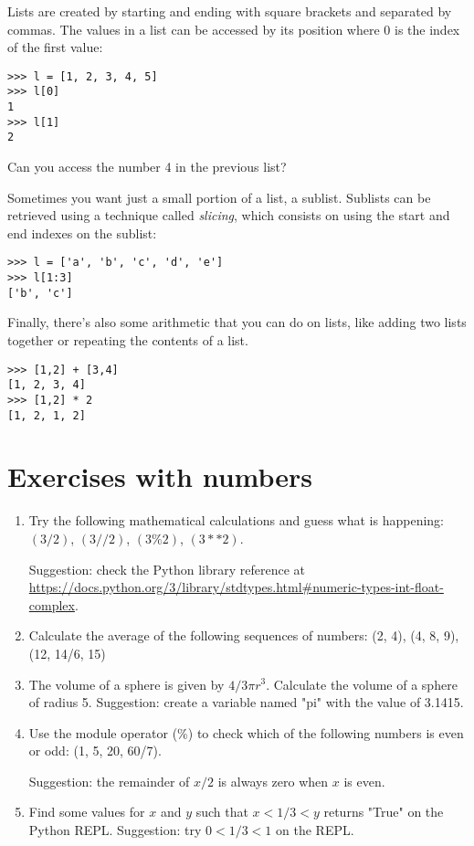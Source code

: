 Lists are created by starting and ending with square brackets and separated by commas. The values in a list can be accessed by its position where 0 is the index of the first value:

\begin{lstlisting}
>>> l = [1, 2, 3, 4, 5]
>>> l[0]
1
>>> l[1]
2
\end{lstlisting}

Can you access the number 4 in the previous list?

Sometimes you want just a small portion of a list, a sublist. Sublists can be retrieved using a technique called \textit{slicing}, which consists on using the start and end indexes on the sublist:

\begin{lstlisting}
>>> l = ['a', 'b', 'c', 'd', 'e']
>>> l[1:3]
['b', 'c']
\end{lstlisting}

Finally, there's also some arithmetic that you can do on lists, like adding two lists together or repeating the contents of a list.

\begin{lstlisting}
>>> [1,2] + [3,4]
[1, 2, 3, 4]
>>> [1,2] * 2
[1, 2, 1, 2]
\end{lstlisting}


\section{Exercises with numbers}

\begin{enumerate}

\item Try the following mathematical calculations and guess what is happening: $(3 / 2)$, $(3 // 2)$, $(3 \% 2)$, $(3**2)$.

Suggestion: check the Python library reference at \url{https://docs.python.org/3/library/stdtypes.html#numeric-types-int-float-complex}.

\item Calculate the average of the following sequences of numbers: (2, 4), (4, 8, 9), (12, 14/6, 15)

\item The volume of a sphere is given by $4/3\pi r^3$. Calculate the volume of a sphere of radius 5. Suggestion: create a variable named "pi" with the value of 3.1415.

\item Use the module operator (\%) to check which of the following numbers is even or odd: (1, 5, 20, 60/7).

Suggestion: the remainder of $x/2$ is always zero when $x$ is even.

\item Find some values for $x$ and $y$ such that $x < 1/3 < y$ returns "True" on the Python REPL. Suggestion: try $0 < 1/3 < 1$ on the REPL.

\end{enumerate}

